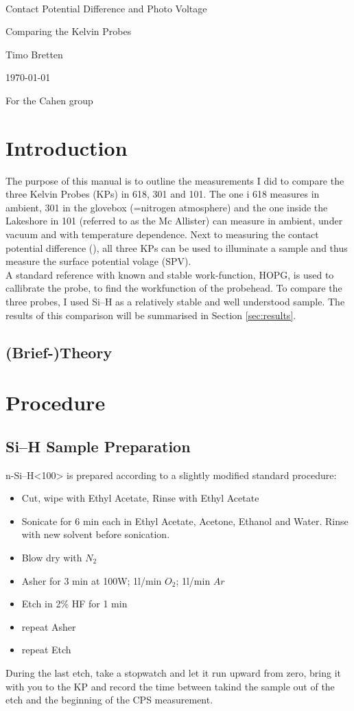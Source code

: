 \documentclass[a4paper,10pt]{article}
\newcommand{\mktit}{
	\thispagestyle{empty}
	\begin{center}
	\hrulefill \\
	\begin{huge}Contact Potential Difference and Photo Voltage \\ \end{huge} 
	\begin{Large} Comparing the Kelvin Probes \\ \end{Large} \vspace*{0.8cm}

	\begin{large}Timo Bretten  \\\end{large} \vspace*{1.2cm}	
	
	\today \\ \vspace*{0.8cm}
	\begin{LARGE}For the Cahen group\\\end{LARGE}
	
	\end{center}
	\newpage
	\setcounter{page}{2}
}
\newcommand{\sih}{Si--H}
\newcommand{\cpd}{\text{CPD}}
\newcommand{\McA}{Mc Allister}
\newcommand{\hopg}{HOPG}
\newcommand{\kp}{KP}
\newcommand{\spv}{SPV}
\begin{document}
\mktit

\section{Introduction}
The purpose of this manual is to outline the measurements I did to compare the three Kelvin Probes (\kp{}s) in 618, 301 and 101. The one i 618 measures in ambient, 301 in the glovebox (=nitrogen atmosphere) and the one inside the Lakeshore in 101 (referred to as the \McA{}) can measure in ambient, under vacuum and with temperature dependence. Next to measuring the contact potential difference (\cpd{}), all three \kp{}s can be used to illuminate a sample and thus measure the surface potential volage (\spv{}).\\
A standard reference with known and stable work-function, \hopg{}, is used to callibrate the probe, to find the workfunction of the probehead. To compare the three probes, I used \sih{} as a relatively stable and well understood sample. The results of this comparison will be summarised in Section \ref{sec:results}.
\subsection{(Brief-)Theory}

\section{Procedure}

\subsection{\sih{} Sample Preparation}
n-\sih <100> is prepared according to a slightly modified standard procedure:
\begin{itemize}
	\item Cut, wipe with Ethyl Acetate, Rinse with Ethyl Acetate
	\item Sonicate for 6 min each in Ethyl Acetate, Acetone, Ethanol and Water. Rinse with new solvent before sonication.
	\item Blow dry with $N_2$
	\item Asher for 3 min at 100W; 1l/min $O_2$; 1l/min $Ar$
	\item Etch in 2\% HF for 1 min
	\item repeat Asher
	\item repeat Etch
\end{itemize}
During the last etch, take a stopwatch and let it run upward from zero, bring it with you to the KP and record the time between takind the sample out of the etch and the beginning of the CPS measurement.
 
\end{document}
